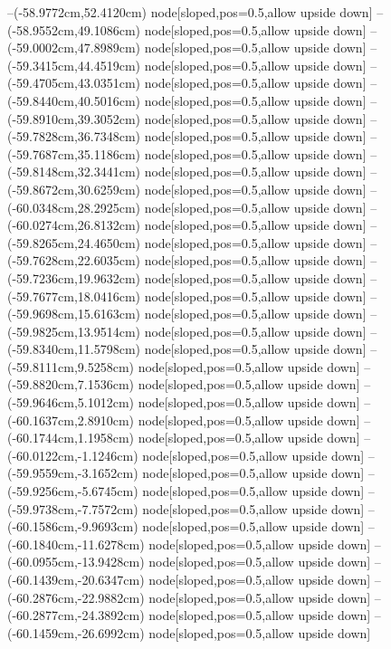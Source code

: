 --(-58.9772cm,52.4120cm) node[sloped,pos=0.5,allow upside down]{\arrowIn}
--(-58.9552cm,49.1086cm) node[sloped,pos=0.5,allow upside down]{\ArrowIn}
--(-59.0002cm,47.8989cm) node[sloped,pos=0.5,allow upside down]{\ArrowIn}
--(-59.3415cm,44.4519cm) node[sloped,pos=0.5,allow upside down]{\ArrowIn}
--(-59.4705cm,43.0351cm) node[sloped,pos=0.5,allow upside down]{\ArrowIn}
--(-59.8440cm,40.5016cm) node[sloped,pos=0.5,allow upside down]{\ArrowIn}
--(-59.8910cm,39.3052cm) node[sloped,pos=0.5,allow upside down]{\ArrowIn}
--(-59.7828cm,36.7348cm) node[sloped,pos=0.5,allow upside down]{\ArrowIn}
--(-59.7687cm,35.1186cm) node[sloped,pos=0.5,allow upside down]{\ArrowIn}
--(-59.8148cm,32.3441cm) node[sloped,pos=0.5,allow upside down]{\ArrowIn}
--(-59.8672cm,30.6259cm) node[sloped,pos=0.5,allow upside down]{\ArrowIn}
--(-60.0348cm,28.2925cm) node[sloped,pos=0.5,allow upside down]{\ArrowIn}
--(-60.0274cm,26.8132cm) node[sloped,pos=0.5,allow upside down]{\ArrowIn}
--(-59.8265cm,24.4650cm) node[sloped,pos=0.5,allow upside down]{\ArrowIn}
--(-59.7628cm,22.6035cm) node[sloped,pos=0.5,allow upside down]{\ArrowIn}
--(-59.7236cm,19.9632cm) node[sloped,pos=0.5,allow upside down]{\ArrowIn}
--(-59.7677cm,18.0416cm) node[sloped,pos=0.5,allow upside down]{\ArrowIn}
--(-59.9698cm,15.6163cm) node[sloped,pos=0.5,allow upside down]{\ArrowIn}
--(-59.9825cm,13.9514cm) node[sloped,pos=0.5,allow upside down]{\ArrowIn}
--(-59.8340cm,11.5798cm) node[sloped,pos=0.5,allow upside down]{\ArrowIn}
--(-59.8111cm,9.5258cm) node[sloped,pos=0.5,allow upside down]{\ArrowIn}
--(-59.8820cm,7.1536cm) node[sloped,pos=0.5,allow upside down]{\ArrowIn}
--(-59.9646cm,5.1012cm) node[sloped,pos=0.5,allow upside down]{\ArrowIn}
--(-60.1637cm,2.8910cm) node[sloped,pos=0.5,allow upside down]{\ArrowIn}
--(-60.1744cm,1.1958cm) node[sloped,pos=0.5,allow upside down]{\ArrowIn}
--(-60.0122cm,-1.1246cm) node[sloped,pos=0.5,allow upside down]{\ArrowIn}
--(-59.9559cm,-3.1652cm) node[sloped,pos=0.5,allow upside down]{\ArrowIn}
--(-59.9256cm,-5.6745cm) node[sloped,pos=0.5,allow upside down]{\ArrowIn}
--(-59.9738cm,-7.7572cm) node[sloped,pos=0.5,allow upside down]{\ArrowIn}
--(-60.1586cm,-9.9693cm) node[sloped,pos=0.5,allow upside down]{\ArrowIn}
--(-60.1840cm,-11.6278cm) node[sloped,pos=0.5,allow upside down]{\ArrowIn}
--(-60.0955cm,-13.9428cm) node[sloped,pos=0.5,allow upside down]{\ArrowIn}
--(-60.1439cm,-20.6347cm) node[sloped,pos=0.5,allow upside down]{\ArrowIn}
--(-60.2876cm,-22.9882cm) node[sloped,pos=0.5,allow upside down]{\ArrowIn}
--(-60.2877cm,-24.3892cm) node[sloped,pos=0.5,allow upside down]{\ArrowIn}
--(-60.1459cm,-26.6992cm) node[sloped,pos=0.5,allow upside down]{\ArrowIn}
